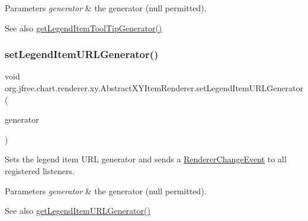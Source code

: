 \begin{DoxyParams}{Parameters}
{\em generator} & the generator ({\ttfamily null} permitted).\\
\hline
\end{DoxyParams}
\begin{DoxySeeAlso}{See also}
\mbox{\hyperlink{classorg_1_1jfree_1_1chart_1_1renderer_1_1xy_1_1_abstract_x_y_item_renderer_a21278a10f7092ac9319851e449f5270b}{get\+Legend\+Item\+Tool\+Tip\+Generator()}} 
\end{DoxySeeAlso}
\mbox{\label{classorg_1_1jfree_1_1chart_1_1renderer_1_1xy_1_1_abstract_x_y_item_renderer_a237e75eddcc381facaf8f3e3b322098b}} 
\subsubsection{\texorpdfstring{set\+Legend\+Item\+U\+R\+L\+Generator()}{setLegendItemURLGenerator()}}
{\footnotesize\ttfamily void org.\+jfree.\+chart.\+renderer.\+xy.\+Abstract\+X\+Y\+Item\+Renderer.\+set\+Legend\+Item\+U\+R\+L\+Generator (\begin{DoxyParamCaption}\item[{\mbox{\hyperlink{interfaceorg_1_1jfree_1_1chart_1_1labels_1_1_x_y_series_label_generator}{X\+Y\+Series\+Label\+Generator}}}]{generator }\end{DoxyParamCaption})}

Sets the legend item U\+RL generator and sends a \mbox{\hyperlink{}{Renderer\+Change\+Event}} to all registered listeners.


\begin{DoxyParams}{Parameters}
{\em generator} & the generator ({\ttfamily null} permitted).\\
\hline
\end{DoxyParams}
\begin{DoxySeeAlso}{See also}
\mbox{\hyperlink{classorg_1_1jfree_1_1chart_1_1renderer_1_1xy_1_1_abstract_x_y_item_renderer_a61559d4682c3b11772aef0668dd9e982}{get\+Legend\+Item\+U\+R\+L\+Generator()}} 
\end{DoxySeeAlso}
\mbox{\label{classorg_1_1jfree_1_1chart_1_1renderer_1_1xy_1_1_abstract_x_y_item_renderer_a6e2df4ddb60eb293a77d7994f316876d}} 
